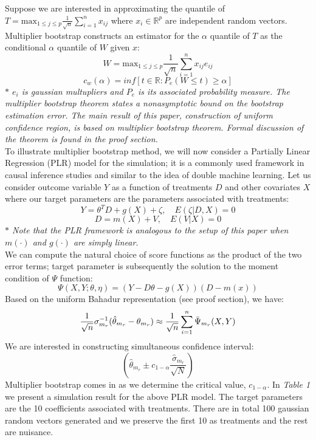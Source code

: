 \documentclass{article}
\begin{document}
\noindent Suppose we are interested in approximating the quantile of $T =  \text{max}_{1 \le j \le p} \frac{1}{\sqrt{n}} \sum_{i=1}^{n} x_{ij}$ where $x_i \in \mathbb{R}^{p}$ are independent random vectors. Multiplier bootstrap constructs an estimator for the $\alpha$ quantile of $T$ as the conditional $\alpha$ quantile of $W$ given $x$:
\[
W =  \text{max}_{1 \le j \le p} \frac{1}{\sqrt{n}} \sum_{i=1}^{n} x_{ij} e_{ij}
\]
\[
c_{w}(\alpha) = inf[t\in \mathbb{R}: P_e (W\le t)\ge \alpha]
\]
\textit{$\ast$ $e_i$ is gaussian multupliers and $P_e$ is its associated probability measure. The multiplier bootstrap theorem states a nonasymptotic bound on the bootstrap estimation error. The main result of this paper, construction of uniform confidence region, is based on multiplier bootstrap theorem. Formal discussion of the theorem is found in the proof section.}\\

\noindent To illustrate multiplier bootstrap method, we will now consider a Partially Linear Regression (PLR) model for the simulation; it is a commonly used framework in causal inference studies and similar to the idea of double machine learning. Let us consider outcome variable $Y$ as a function of treatments $D$ and other covariates $X$ where our target parameters are the parameters associated with treatments:\\
\[
Y = \theta^T D + g(X) + \zeta, \quad E(\zeta | D,X) = 0 
\]
\[
D = m(X) + V, \quad E(V|X) = 0
\]
\textit{$\ast$ Note that the PLR framework is analogous to the setup of this paper when $m(\cdot)$ and $g(\cdot)$ are simply linear.} \\
We can compute the natural choice of score functions as the product of the two error terms; target parameter is subsequently the solution to the moment condition of $\Psi$ function:
\[
\Psi(X,Y;\theta,\eta) = (Y-D\theta-g(X))(D-m(x))
\]
Based on the uniform Bahadur representation (see proof section), we have:
\[
\frac{1}{\sqrt{n}} \sigma^{-1}_{m_r} (\hat{\theta}_{m_r} - \theta_{m_r}) \approx \frac{1}{\sqrt{n}} \sum_{i=1}^{n} \Bar{\Psi}_{m_r}(X,Y)
\]
We are interested in constructing simultaneous confidence interval:
\[
(\hat{\theta}_{m_r} \pm c_{1-\alpha} \frac{\hat{\sigma}_{m_r}}{\sqrt{N}})
\]
Multiplier bootstrap comes in as we determine the critical value, $c_{1-\alpha}$. In \textit{Table 1} we present a simulation result for the above PLR model. The target parameters are the 10 coefficients associated with treatments. There are in total 100 gaussian random vectors generated and we preserve the first 10 as treatments and the rest are nuisance.
\newpage
\end{document}
